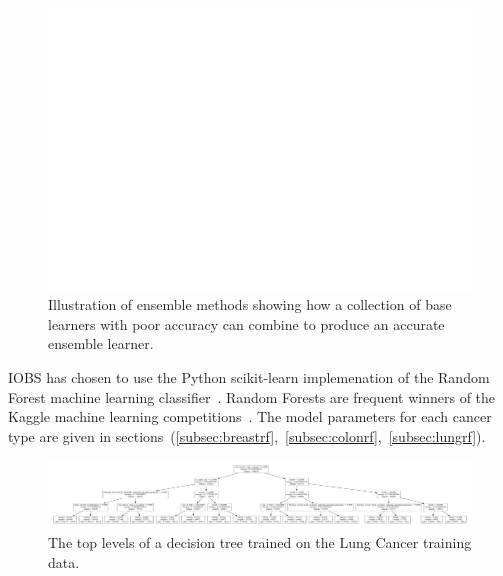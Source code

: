 \documentclass[a4paper,11pt]{article}
\begin{document}
\begin{figure}[!ht]
  \centering
    \includegraphics[scale=.75]{ensemble}
\caption{\label{fig:ensemble} Illustration of ensemble methods showing how a collection of base learners with poor accuracy can combine to produce an accurate ensemble learner.}
\end{figure}


IOBS has chosen to use the Python scikit-learn implemenation of the Random Forest machine 
learning classifier~\cite{rf}.
Random Forests are frequent winners of the Kaggle machine learning competitions~\cite{kagglerf}.
The model parameters for each cancer type are given in sections~(\ref{subsec:breastrf},~\ref{subsec:colonrf},~\ref{subsec:lungrf}).






\begin{figure}
\centering 
\begin{center}
\includegraphics[width=.95\textwidth,origin=c]{lungdt.pdf}
\caption{\label{fig:lungdt} The top levels of a decision tree trained on the Lung Cancer training data.}
\end{center}
\end{figure}
\end{document}
